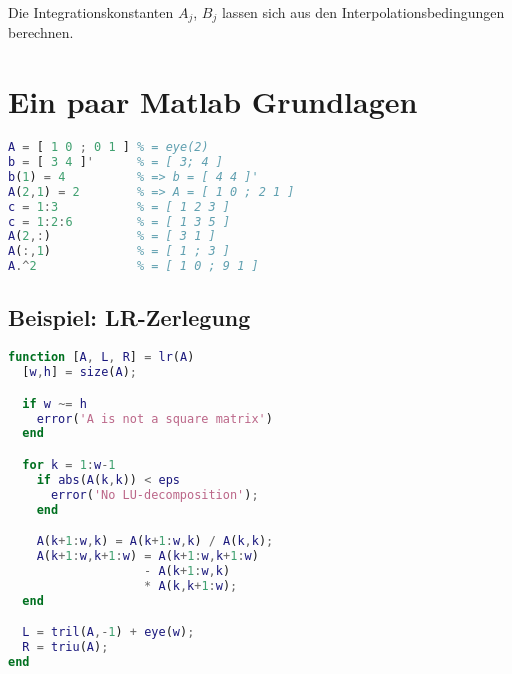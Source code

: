 Die Integrationskonstanten $A_j$, $B_j$ lassen sich aus den Interpolationsbedingungen berechnen.

\section*{Ein paar Matlab Grundlagen}

\begin{lstlisting}[frame=single,language=Matlab]
A = [ 1 0 ; 0 1 ] % = eye(2)
b = [ 3 4 ]'      % = [ 3; 4 ]
b(1) = 4          % => b = [ 4 4 ]'
A(2,1) = 2        % => A = [ 1 0 ; 2 1 ]
c = 1:3           % = [ 1 2 3 ]
c = 1:2:6         % = [ 1 3 5 ]
A(2,:)            % = [ 3 1 ]
A(:,1)            % = [ 1 ; 3 ]
A.^2              % = [ 1 0 ; 9 1 ]
\end{lstlisting}

\subsection*{Beispiel: LR-Zerlegung}

\begin{lstlisting}[frame=single,language=Matlab]
function [A, L, R] = lr(A)
  [w,h] = size(A);

  if w ~= h
    error('A is not a square matrix')
  end

  for k = 1:w-1
    if abs(A(k,k)) < eps
      error('No LU-decomposition');
    end

    A(k+1:w,k) = A(k+1:w,k) / A(k,k);
    A(k+1:w,k+1:w) = A(k+1:w,k+1:w)
                   - A(k+1:w,k)
                   * A(k,k+1:w);
  end

  L = tril(A,-1) + eye(w);
  R = triu(A);
end
\end{lstlisting}
